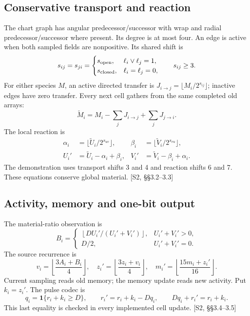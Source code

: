 \documentclass[11pt,a4paper]{article}
\numberwithin{equation}{section}
\newcommand{\src}[2]{{\sffamily\small\color{slate}[#1, #2]}}
\newcommand{\ind}{\mathbf 1}
\begin{document}
\subsection{Conservative transport and reaction}
The chart graph has angular predecessor/successor with wrap and radial predecessor/successor where present. Its degree is at most four. An edge is active when both sampled fields are nonpositive. Its shared shift is
\begin{equation}
s_{ij}=s_{ji}=\begin{cases}
s_{\rm open},&\ell_i\lor\ell_j=1,\\
s_{\rm closed},&\ell_i=\ell_j=0,
\end{cases}\qquad s_{ij}\ge3.
\end{equation}
For either species $M$, an active directed transfer is $J_{i\to j}=\lfloor M_i/2^{s_{ij}}\rfloor$; inactive edges have zero transfer. Every next cell gathers from the same completed old arrays:
\begin{equation}
\widetilde M_i=M_i-\sum_jJ_{i\to j}+\sum_jJ_{j\to i}.
\end{equation}
The local reaction is
\begin{align}
\alpha_i&=\lfloor\widetilde U_i/2^{s_{uv}}\rfloor,
&\beta_i&=\lfloor\widetilde V_i/2^{s_{vu}}\rfloor,\\
U_i'&=\widetilde U_i-\alpha_i+\beta_i,
&V_i'&=\widetilde V_i-\beta_i+\alpha_i.
\end{align}
The demonstration uses transport shifts 3 and 4 and reaction shifts 6 and 7. These equations conserve global material. \src{S2}{§§3.2--3.3}

\subsection{Activity, memory and one-bit output}
The material-ratio observation is
\begin{equation}
B_i=\begin{cases}
\left\lfloor DU_i'/(U_i'+V_i')\right\rfloor,&U_i'+V_i'>0,\\
D/2,&U_i'+V_i'=0.
\end{cases}
\end{equation}
The source recurrence is
\begin{equation}
v_i=\left\lfloor\frac{3A_i+B_i}{4}\right\rfloor,\quad
z_i'=\left\lfloor\frac{3z_i+v_i}{4}\right\rfloor,\quad
m_i'=\left\lfloor\frac{15m_i+z_i'}{16}\right\rfloor.
\end{equation}
Current sampling reads old memory; the memory update reads new activity. Put $k_i=z_i'$. The pulse codec is
\begin{equation}
q_i=\ind\{r_i+k_i\ge D\},\qquad
r_i'=r_i+k_i-Dq_i,
\qquad Dq_i+r_i'=r_i+k_i.
\label{eq:pulse}
\end{equation}
This last equality is checked in every implemented cell update. \src{S2}{§§3.4--3.5}
\end{document}
